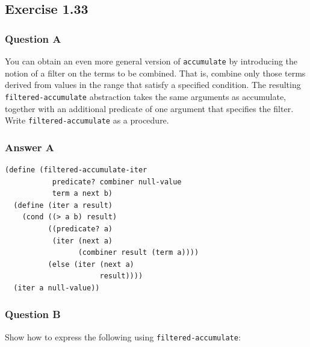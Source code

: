 \documentclass[final,fleqn,titlepage,twoside]{article}
\begin{document}
\subsection{Exercise 1.33}
\label{sec:org44ca429}
\subsubsection{Question A}
\label{sec:orgaa91167}
You can obtain an even more general version of \texttt{accumulate} by
introducing the notion of a filter on the terms to be combined. That is, combine
only those terms derived from values in the range that satisfy a specified
condition. The resulting \texttt{filtered-accumulate} abstraction takes the
same arguments as accumulate, together with an additional predicate of one
argument that specifies the filter. Write \texttt{filtered-accumulate} as a
procedure.

\subsubsection{Answer A}
\label{sec:orgfd7dddb}
\begin{verbatim}
(define (filtered-accumulate-iter
           predicate? combiner null-value
           term a next b)
  (define (iter a result)
    (cond ((> a b) result)
          ((predicate? a)
           (iter (next a)
                 (combiner result (term a))))
          (else (iter (next a)
                      result))))
  (iter a null-value))
\end{verbatim}

\subsubsection{Question B}
\label{sec:orgabdc4a9}
Show how to express the following using \texttt{filtered-accumulate}:
\end{document}
